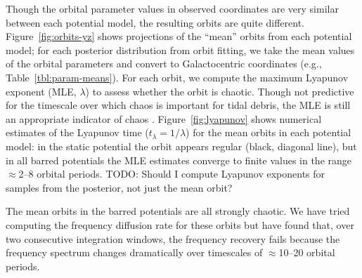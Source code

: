 \documentclass[letterpaper,12pt,preprint]{aastex}
\newcommand{\todo}[1]{{\color{red} TODO: #1}}
\begin{document}
Though the orbital parameter values in observed coordinates are very similar between each potential model, the resulting orbits are quite different. Figure~\ref{fig:orbits-yz} shows projections of the ``mean'' orbits from each potential model; for each posterior distribution from orbit fitting, we take the mean values of the orbital parameters and convert to Galactocentric coordinates (e.g., Table~\ref{tbl:param-means}). For each orbit, we compute the maximum Lyapunov exponent (MLE, $\lambda$) to assess whether the orbit is chaotic.  Though not predictive for the timescale over which chaos is important for tidal debris, the MLE is still an appropriate indicator of chaos \citep{apw15-chaos}. Figure~\ref{fig:lyapunov} shows numerical estimates of the Lyapunov time ($t_\lambda = 1/\lambda$) for the mean orbits in each potential model: in the static potential the orbit appears regular (black, diagonal line), but in all barred potentials the MLE estimates converge to finite values in the range $\approx$2--8 orbital periods. \todo{Should I compute Lyapunov exponents for samples from the posterior, not just the mean orbit?}

The mean orbits in the barred potentials are all strongly chaotic. We have tried computing the frequency diffusion rate for these orbits but have found that, over two consecutive integration windows, the frequency recovery fails because the frequency spectrum changes dramatically over timescales of $\approx$10--20 orbital periods.
\end{document}
